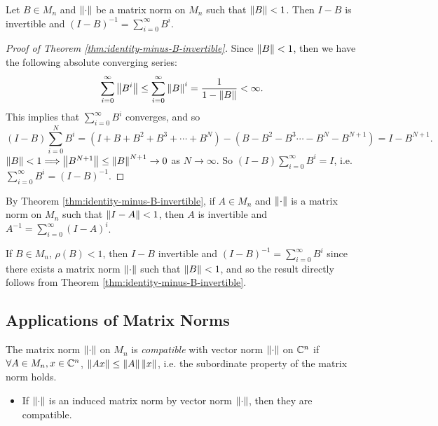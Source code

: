 \begin{theorem}
\label{thm:identity-minus-B-invertible}
Let $B \in M_n$ and $\left\lVert\cdot\right\rVert$ be a matrix norm on $M_n$ such that $\left\lVert B\right\rVert < 1$. Then $I-B$ is invertible and $(I-B)^{-1} = \sum_{i=0}^\infty B^i$.
\end{theorem}
\begin{proof}[Proof of Theorem \ref{thm:identity-minus-B-invertible}]
Since $\left\lVert B\right\rVert < 1$, then we have the following absolute converging series:
\[
\sum_{i=0}^\infty \left\lVert B^i\right\rVert \le \sum_{i=0}^\infty \left\lVert B\right\rVert^i = \frac{1}{1-\left\lVert B\right\rVert} < \infty.
\]
This implies that $\sum_{i=0}^\infty B^i$ converges, and so
\[
(I-B) \sum_{i=0}^N B^i = \left(I + B + B^2 + B^3 + \cdots + B^N\right) - \left(B - B^2 - B^3 \cdots - B^N - B^{N+1}\right) = I-B^{N+1}.
\]
$\left\lVert B\right\rVert < 1 \Longrightarrow \left\lVert B^{N+1}\right\rVert \le \left\lVert B\right\rVert^{N+1} \rightarrow 0$ as $N\rightarrow\infty$. So $(I-B) \sum_{i=0}^\infty B^i = I$, i.e. $\sum_{i=0}^\infty B^i = (I-B)^{-1}$.
\end{proof}

\begin{note*}
By Theorem \ref{thm:identity-minus-B-invertible}, if $A\in M_n$ and $\left\lVert\cdot\right\rVert$ is a matrix norm on $M_n$ such that $\left\lVert I-A\right\rVert < 1$, then $A$ is invertible and $A^{-1} = \sum_{i=0}^\infty (I-A)^i$.
\end{note*}

\begin{note*}
If $B \in M_n$, $\rho(B) < 1$, then $I-B$ invertible and $(I-B)^{-1} = \sum_{i=0}^\infty B^i$ since there exists a matrix norm $\left\lVert\cdot\right\rVert$ such that $\left\lVert B\right\rVert < 1$, and so the result directly follows from Theorem \ref{thm:identity-minus-B-invertible}.
\end{note*}

\subsection{Applications of Matrix Norms}
\begin{definition}[Compatibility]
\label{def:compatibility}
The matrix norm $\left\lVert\cdot\right\rVert$ on $M_n$ is \textit{compatible} with vector norm $\left\lVert\cdot\right\rVert$ on $\mathbb C^n$ if $\forall A \in M_n, x \in \mathbb C^n$, $\left\lVert Ax\right\rVert \le \left\lVert A\right\rVert\left\lVert x\right\rVert$, i.e. the subordinate property of the matrix norm holds.
\begin{itemize}
    \item If $\left\lVert\cdot\right\rVert$ is an induced matrix norm by vector norm $\left\lVert\cdot\right\rVert$, then they are compatible.
\end{itemize}
\end{definition}

